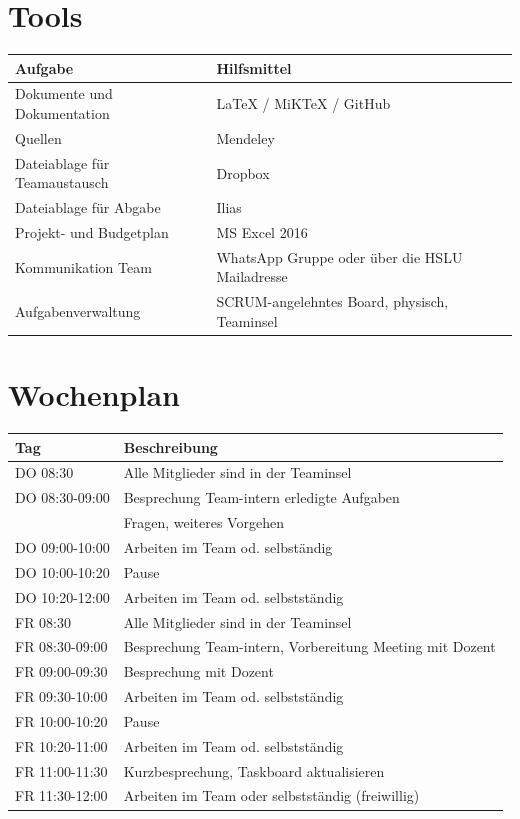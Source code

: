 \documentclass[a4paper]{report}
\begin{document}
\section{Tools}
\begin{tabular}{|p{}|p{}|}
	\hline
	\textbf{Aufgabe} & \textbf{Hilfsmittel} \\
	\hline
	Dokumente und Dokumentation & LaTeX / MiKTeX / GitHub \\
	\hline
	Quellen & Mendeley \\
	\hline
	Dateiablage für Teamaustausch & Dropbox \\
	\hline
	Dateiablage für Abgabe & Ilias \\
	\hline
	Projekt- und Budgetplan & MS Excel 2016 \\
	\hline
	Kommunikation Team & WhatsApp Gruppe oder über die HSLU Mailadresse\\
	\hline
	Aufgabenverwaltung & SCRUM-angelehntes Board, physisch, Teaminsel\\
	\hline
\end{tabular}

\section{Wochenplan}
\begin{tabular}{|p{}|p{}|}
	\hline
	\textbf{Tag} & \textbf{Beschreibung} \\
	\hline
	DO 08:30 & Alle Mitglieder sind in der Teaminsel \\
	\hline
	DO 08:30-09:00 & Besprechung Team-intern erledigte Aufgaben \\
	& Fragen, weiteres Vorgehen \\
	\hline
	DO 09:00-10:00 & Arbeiten im Team od. selbständig \\
	\hline
	DO 10:00-10:20 & Pause \\
	\hline
	DO 10:20-12:00 & Arbeiten im Team od. selbstständig \\
	\hline
	FR 08:30 & Alle Mitglieder sind in der Teaminsel \\
	\hline
	FR 08:30-09:00 & Besprechung Team-intern, Vorbereitung Meeting mit Dozent \\
	\hline
	FR 09:00-09:30& Besprechung mit Dozent \\
	\hline
	FR 09:30-10:00 & Arbeiten im Team od. selbstständig \\
	\hline
	FR 10:00-10:20 & Pause \\
	\hline
	FR 10:20-11:00 & Arbeiten im Team od. selbstständig \\
	\hline
	FR 11:00-11:30 & Kurzbesprechung, Taskboard aktualisieren \\
	\hline
	FR 11:30-12:00 & Arbeiten im Team oder selbstständig (freiwillig)\\
	\hline
\end{tabular}
\end{document}
